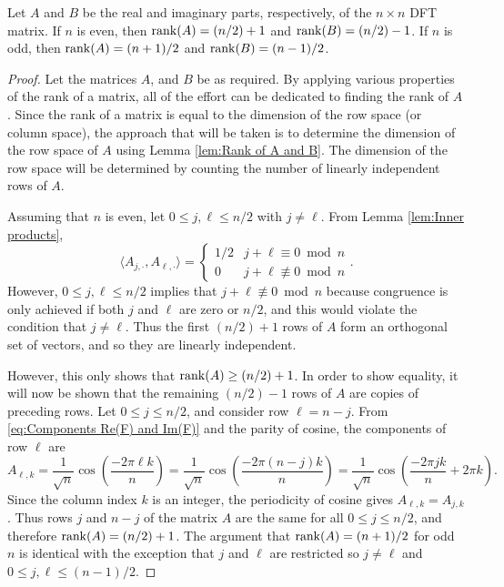 \begin{lemma}
\label{lem:Rank of A and B}
Let $A$ and $B$ be the real and imaginary parts, respectively, of the $n \times n$ DFT matrix. If $n$ is even, then $\operatorname{rank}(A) = (n/2)+1$ and $\operatorname{rank}(B) = (n/2)-1$. If $n$ is odd, then $\operatorname{rank}(A) = (n+1)/2$ and $\operatorname{rank}(B) = (n-1)/2$. 
\begin{proof}
Let the matrices $A$, and $B$ be as required. By applying various properties of the rank of a matrix, all of the effort can be dedicated to finding the rank of $A$. Since the rank of a matrix is equal to the dimension of the row space (or column space), the approach that will be taken is to determine the dimension of the row space of $A$ using Lemma \ref{lem:Rank of A and B}. The dimension of the row space will be determined by counting the number of linearly independent rows of $A$. \par 
Assuming that $n$ is even, let $0 \leq j,\ell \leq n/2$ with $j \neq \ell$. From Lemma \ref{lem:Inner products},
\[\langle A_{j,\cdot},A_{\ell,\cdot}\rangle = \begin{cases}
1/2 & j+\ell \equiv 0 \bmod n \\
0 & j+\ell \not\equiv 0 \bmod n
\end{cases}.\]
However, $0 \leq j,\ell \leq n/2$ implies that $j+\ell \not\equiv 0 \bmod n$ because congruence is only achieved if both $j$ and $\ell$ are zero or $n/2$, and this would violate the condition that $j \neq \ell$. Thus the first $(n/2)+1$ rows of $A$ form an orthogonal set of vectors, and so they are linearly independent. \par 
However, this only shows that $\operatorname{rank}(A) \geq (n/2)+1$. In order to show equality, it will now be shown that the remaining $(n/2)-1$ rows of $A$ are copies of preceding rows. Let $0 \leq j \leq n/2$, and consider row $\ell = n - j$. From \eqref{eq:Components Re(F) and Im(F)} and the parity of cosine, the components of row $\ell$ are
\[A_{\ell,{k}} = \frac{1}{\sqrt{n}}\cos\left(\frac{-2\pi{\ell{k}}}{n}\right) = \frac{1}{\sqrt{n}}\cos\left(\frac{-2\pi{(n-j){k}}}{n}\right) = \frac{1}{\sqrt{n}}\cos\left(\frac{-2\pi{jk}}{n} + 2\pi{k}\right).\]
Since the column index $k$ is an integer, the periodicity of cosine gives $A_{\ell,{k}} = A_{j,k}$. Thus rows $j$ and $n-j$ of the matrix $A$ are the same for all $0 \leq j \leq n/2$, and therefore $\operatorname{rank}(A) = (n/2)+1$.  The argument that $\operatorname{rank}(A) = (n+1)/2$ for odd $n$ is identical with the exception that $j$ and $\ell$ are restricted so $j \neq \ell$ and $0 \leq j,\ell \leq (n-1)/2$. \par 

\end{proof}
\end{lemma}
